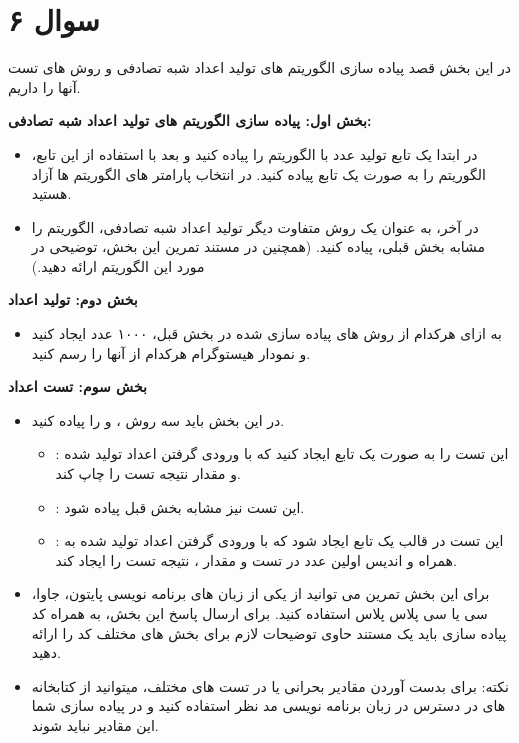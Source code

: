 \section*{سوال ۶}

در این بخش قصد پیاده سازی الگوریتم های تولید اعداد شبه تصادفی و روش های تست آنها را داریم.

\textbf{بخش اول: پیاده سازی الگوریتم های تولید اعداد شبه تصادفی:}
\begin{itemize}
	\item در ابتدا یک تابع تولید عدد با الگوریتم  را پیاده کنید و بعد با استفاده از این تابع، الگوریتم  را به صورت یک تابع پیاده کنید. در انتخاب پارامتر های الگوریتم ها آزاد هستید.
	\item در آخر، به عنوان یک روش متفاوت دیگر تولید اعداد شبه تصادفی، الگوریتم  را مشابه بخش قبلی، پیاده کنید. (همچنین در مستند تمرین این بخش، توضیحی در مورد این الگوریتم ارائه دهید.)
\end{itemize}

\textbf{بخش دوم: تولید اعداد}
\begin{itemize}
	\item به ازای هرکدام از روش های پیاده سازی شده در بخش قبل، ۱۰۰۰ عدد ایجاد کنید و نمودار هیستوگرام هرکدام از آنها را رسم کنید.
\end{itemize}

\textbf{بخش سوم: تست اعداد}
\begin{itemize}
	\item در این بخش باید سه روش ،  و  را پیاده کنید.
	\begin{itemize}
		\item {}: این تست را به صورت یک تابع ایجاد کنید که با ورودی گرفتن اعداد تولید شده و مقدار  نتیجه تست را چاپ کند.
		\item {}: این تست نیز مشابه بخش قبل پیاده شود.
		\item {}: این تست در قالب یک تابع ایجاد شود که با ورودی گرفتن اعداد تولید شده به همراه  و اندیس اولین عدد در تست و مقدار ، نتیجه تست را ایجاد کند.
	\end{itemize}
	\item برای این بخش تمرین می توانید از یکی از زبان های برنامه نویسی پایتون، جاوا، سی یا سی پلاس پلاس استفاده کنید. برای ارسال پاسخ این بخش، به همراه کد پیاده سازی باید یک مستند حاوی توضیحات لازم برای بخش های مختلف کد را ارائه دهید.
	\item نکته: برای بدست آوردن مقادیر بحرانی یا  در تست های مختلف، میتوانید از کتابخانه های در دسترس در زبان برنامه نویسی مد نظر استفاده کنید و در پیاده سازی شما این مقادیر نباید  شوند.
\end{itemize}

